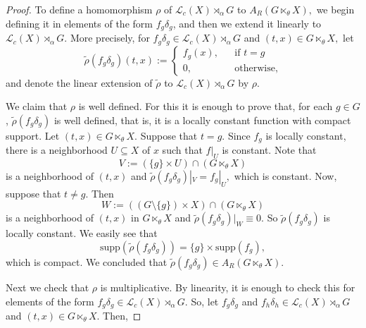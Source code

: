 \documentclass[11pt, a4paper]{amsart}
\newcommand{\Gx}{\ensuremath {G \ltimes_\theta X}}
\newcommand{\Lg}{\ensuremath {\mathcal{L}_c(X)\rtimes_{\alpha} G}}
\theoremstyle{plain}
\begin{document}
\begin{proof}
To define a homomorphism $\rho$ of $\Lg$ to $A_R(\Gx),$  we begin defining it in elements of the form $f_g\delta_g$, and then we extend it linearly to $\Lg.$ More precisely, for $f_g\delta_g \in \Lg$ and $(t,x) \in \Gx,$ let
 $$\tilde{\rho}(f_g\delta_g)(t,x):= \left\lbrace\begin{array}{ccl}
 f_g(x), & & \mbox{if} \,\, t=g \\
 0 , & & \mbox{otherwise},
 \end{array}  \right.$$
and denote the linear extension of  $\tilde{\rho}$ to $\Lg$ by $\rho.$

We claim that $\rho$ is well defined. For this it is enough to prove that, for each $g\in G$, $\tilde{\rho}(f_g\delta_g)$ is well defined, that is, it is a locally constant function with compact support. Let $(t,x) \in \Gx.$ Suppose that $t=g.$ Since $f_g$ is locally constant, there is a neighborhood $U \subseteq X$ of $x$ such that $ f|_U$ is constant. Note that
$$V:= (\{g\} \times U) \cap (\Gx)$$
is a neighborhood of $(t,x)$ and $\tilde\rho(f_g\delta_g)|_V=f_g|_U,$ which is constant. 
Now, suppose that $t \neq g.$ Then 
 $$W:=((G \setminus \{g\}) \times X ) \cap (\Gx)$$
is a neighborhood of $(t,x)$ in $\Gx$ and $\tilde\rho(f_g\delta_g)|_W \equiv 0.$ So $\tilde{\rho}(f_g\delta_g)$ is locally constant.  We easily see that 
 $$\mbox{supp}(\tilde\rho(f_g\delta_g))=\{g\} \times \mbox{supp}(f_g),$$
which is compact. We concluded that  $\tilde\rho(f_g\delta_g) \in A_R(\Gx).$
 
Next we check that $\rho$ is multiplicative. By linearity, it is enough to check this for elements of the form $f_g\delta_g \in \Lg.$ So, let $f_g\delta_g$ and $f_h\delta_h \in \Lg$ and $(t,x) \in \Gx.$ Then,


\end{proof}
\end{document}
